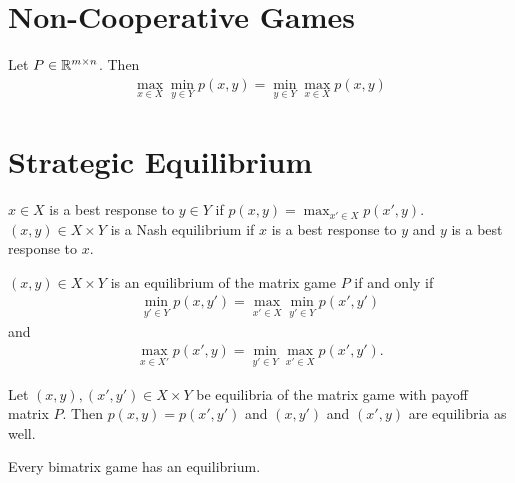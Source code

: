 
\chapter{Non-Cooperative Games}
\label{cha:non-coop-games}

\begin{thm}
  \label{defn:non_cooperative_games:1}
  Let $P \in \mathbb{R}^{m \times n}$.  Then
  \begin{align}
    \label{eq:28}
    \max_{x \in X} \min_{y \in Y} p(x, y) = \min_{y \in Y} \max_{x \in
    X} p(x, y)
  \end{align}
\end{thm}

\chapter{Strategic Equilibrium}
\label{cha:strat-equil}

\begin{defn}
  \label{defn:non_cooperative_games:2}
  $x \in X$ is a best response to $y \in Y$ if $p(x, y) = \max_{x' \in
    X} p(x', y)$.  $(x, y) \in X \times Y$ is a Nash equilibrium if
  $x$ is a best response to $y$ and $y$ is a best response to $x$.
\end{defn}

\begin{thm}
  \label{defn:non_cooperative_games:3}
  $(x, y) \in X \times Y$ is an equilibrium of the matrix game $P$ if
  and only if
  \begin{align}
    \label{eq:33}
    \min_{y' \in Y} p(x, y') = \max_{x' \in X} \min_{y' \in Y} p(x',
    y')
  \end{align} and
  \begin{align}
    \label{eq:34}
    \max_{x \in X'} p(x', y) = \min_{y' \in Y} \max_{x' \in X} p(x', y').
  \end{align}
\end{thm}

\begin{thm}
  \label{defn:non_cooperative_games:4}
  Let $(x, y), (x', y') \in X \times Y$ be equilibria of the matrix
  game with payoff matrix $P$.  Then $p(x, y) = p(x', y')$ and $(x,
  y')$ and $(x', y)$ are equilibria as well.
\end{thm}

\begin{thm}[Nash, 1951]
  \label{defn:non_cooperative_games:5}
  Every bimatrix game has an equilibrium.
\end{thm}

